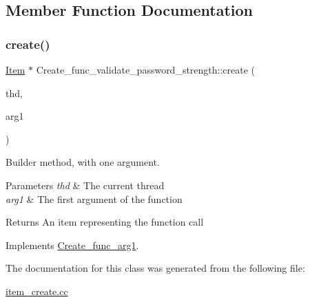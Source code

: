 \subsection{Member Function Documentation}
\mbox{\label{classCreate__func__validate__password__strength_a6d40eb95bb5d943da9a140cb119b0966}} 
\subsubsection{\texorpdfstring{create()}{create()}}
{\footnotesize\ttfamily \mbox{\hyperlink{classItem}{Item}} $\ast$ Create\+\_\+func\+\_\+validate\+\_\+password\+\_\+strength\+::create (\begin{DoxyParamCaption}\item[{T\+HD $\ast$}]{thd,  }\item[{\mbox{\hyperlink{classItem}{Item}} $\ast$}]{arg1 }\end{DoxyParamCaption})\hspace{0.3cm}{\ttfamily [virtual]}}

Builder method, with one argument. 
\begin{DoxyParams}{Parameters}
{\em thd} & The current thread \\
\hline
{\em arg1} & The first argument of the function \\
\hline
\end{DoxyParams}
\begin{DoxyReturn}{Returns}
An item representing the function call 
\end{DoxyReturn}


Implements \mbox{\hyperlink{classCreate__func__arg1_a3e9a98f755cd82c3e762e334c955a8c9}{Create\+\_\+func\+\_\+arg1}}.



The documentation for this class was generated from the following file\+:\begin{DoxyCompactItemize}
\item 
\mbox{\hyperlink{item__create_8cc}{item\+\_\+create.\+cc}}\end{DoxyCompactItemize}
